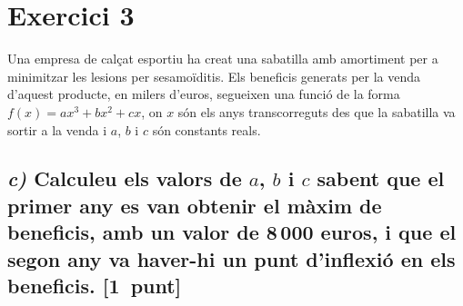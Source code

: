 \documentclass[11pt,a4paper]{article}
\begin{document}
\section*{\textcolor{blauPista}{Exercici 3}}

\noindent Una empresa de calçat esportiu ha creat una sabatilla amb amortiment per a minimitzar les lesions per sesamoïditis. Els beneficis generats per la venda d'aquest producte, en milers d'euros, segueixen una funció de la forma $f(x) = ax^{3} + bx^{2} + cx$, on $x$ són els anys transcorreguts des que la sabatilla va sortir a la venda i $a$, $b$ i $c$ són constants reals.

\subsection*{\textit{c)} \normalfont Calculeu els valors de $a$, $b$ i $c$ sabent que el primer any es van obtenir el màxim de beneficis, amb un valor de 8\,000 euros, i que el segon any va haver-hi un punt d'inflexió en els beneficis. \hspace*{\fill}\textnormal{[1~punt]}}

\end{document}
